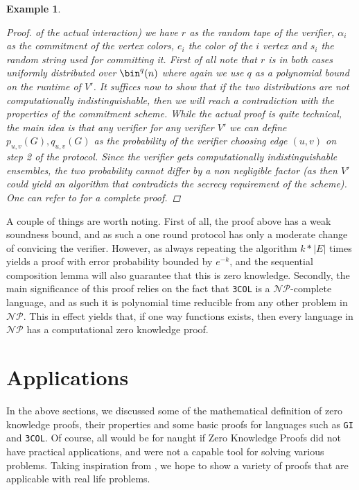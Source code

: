 \documentclass{article}
\newtheorem{example}{Example}
\begin{document}
\begin{example}
\begin{proof}
        of the actual interaction)
        we have $r$ as the random tape of the verifier, $\alpha_i$ as the commitment of the vertex colors, $e_i$ the color of the $i$ vertex and $s_i$ the 
        random string used for committing it. First of all note that $r$ is in both cases uniformly distributed over $\bin^q(n)$ where again we 
        use $q$ as a polynomial bound on the runtime of $V'$. It suffices now to show that if the two distributions are
        not computationally indistinguishable, then we will reach a contradiction with the properties of the commitment scheme. 
        While the actual proof is quite technical, the main idea is that any verifier for any verifier $V'$ we can
        define $p_{u, v}(G), q_{u,v}(G)$ as the probability of the verifier choosing edge $(u,v)$ on step 2 of the protocol.
        Since the verifier gets computationally indistinguishable ensembles, the two probability cannot differ by a non negligible factor 
        (as then $V'$ could yield an algorithm that contradicts the secrecy requirement of the scheme). One can refer to \cite{goldreichFoundationsCryptographyVol2007}
        for a complete proof.
        
    \end{proof}
\end{example}

A couple of things are worth noting. First of all, the proof above has a weak soundness bound, and as such 
a one round protocol has only a moderate change of convicing the verifier. However, as always repeating the 
algorithm $k * |E|$ times yields a proof with error probability bounded by $e^{-k}$, and the sequential composition lemma will
also guarantee that this is zero knowledge. Secondly, the main significance of this proof relies on the fact that 
\texttt{3COL} is a $\mathcal{NP}$-complete language, and as such it is polynomial time reducible from any other problem in $\mathcal{NP}$.
This in effect yields that, if one way functions exists, then every language in $\mathcal{NP}$ has a computational zero knowledge proof.

\section{Applications}
In the above sections, we discussed some of the mathematical definition of zero knowledge proofs, their properties and some basic
proofs for languages such as \texttt{GI} and \texttt{3COL}. Of course, all would be for naught if Zero Knowledge Proofs
did not have practical applications, and were not a capable tool for solving various problems. 
Taking inspiration from \cite{moraisSurveyZeroKnowledge2019}, we hope to show a variety of proofs that 
are applicable with real life problems. 
\end{document}
